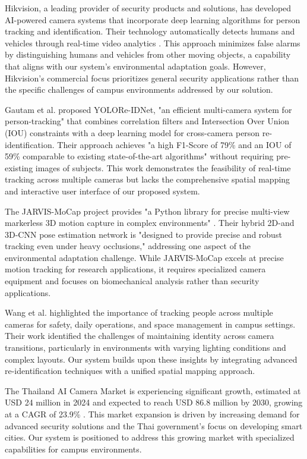 Hikvision, a leading provider of security products and solutions, has developed AI-powered camera systems that incorporate deep learning algorithms for person tracking and identification. Their technology automatically detects humans and vehicles through real-time video analytics \cite{hikvision:acusense}. This approach minimizes false alarms by distinguishing humans and vehicles from other moving objects, a capability that aligns with our system's environmental adaptation goals. However, Hikvision's commercial focus prioritizes general security applications rather than the specific challenges of campus environments addressed by our solution.

Gautam et al. \cite{gautam:2023} proposed YOLORe-IDNet, "an efficient multi-camera system for person-tracking" that combines correlation filters and Intersection Over Union (IOU) constraints with a deep learning model for cross-camera person re-identification. Their approach achieves "a high F1-Score of 79\% and an IOU of 59\% comparable to existing state-of-the-art algorithms" without requiring pre-existing images of subjects. This work demonstrates the feasibility of real-time tracking across multiple cameras but lacks the comprehensive spatial mapping and interactive user interface of our proposed system.

The JARVIS-MoCap project provides "a Python library for precise multi-view markerless 3D motion capture in complex environments" \cite{jarvis:github}. Their hybrid 2D-and 3D-CNN pose estimation network is "designed to provide precise and robust tracking even under heavy occlusions," addressing one aspect of the environmental adaptation challenge. While JARVIS-MoCap excels at precise motion tracking for research applications, it requires specialized camera equipment and focuses on biomechanical analysis rather than security applications.

Wang et al. \cite{wangetal:2021} highlighted the importance of tracking people across multiple cameras for safety, daily operations, and space management in campus settings. Their work identified the challenges of maintaining identity across camera transitions, particularly in environments with varying lighting conditions and complex layouts. Our system builds upon these insights by integrating advanced re-identification techniques with a unified spatial mapping approach.

The Thailand AI Camera Market is experiencing significant growth, estimated at USD 24 million in 2024 and expected to reach USD 86.8 million by 2030, growing at a CAGR of 23.9\% \cite{thailand:market}. This market expansion is driven by increasing demand for advanced security solutions and the Thai government's focus on developing smart cities. Our system is positioned to address this growing market with specialized capabilities for campus environments.

